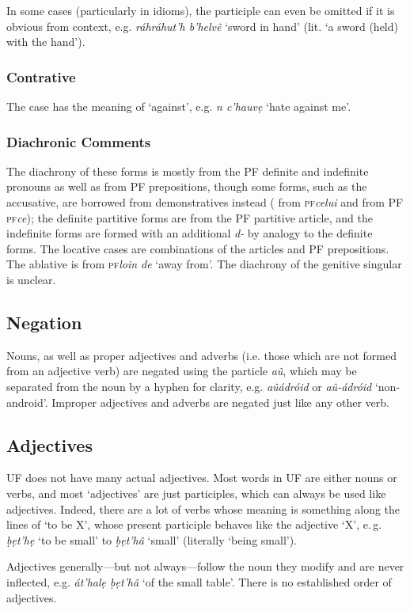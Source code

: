 \documentclass[a4paper, 12pt, twoside, final]{article}
\def\pfabbr{{\normalfont\scshape pf\space}}
\def\pf#1{\pfabbr\textit{#1}}
\let \w \textit
\begin{document}
In some cases (particularly in idioms), the participle can even be omitted if it is obvious from context, e.g. \w{ráhráhut’h
b’helvê} ‘sword in hand’ (lit. ‘a sword (held) with the hand’).

\subsubsection{Contrative}
The  case has the meaning of ‘against’, e.g. \w{n c’hauvẹ} ‘hate against me’.

\subsubsection{Diachronic Comments}
The diachrony of these forms is mostly from the PF definite and indefinite pronouns as well as from PF prepositions, though
some forms, such as the
accusative, are borrowed from demonstratives instead ( from \pf{celui} and  from PF \pf{ce}); the definite
partitive forms are from the PF partitive article, and
the indefinite forms are formed with an additional \w{d-} by analogy to the definite forms. The locative cases are combinations
of the articles and PF prepositions. The ablative is from \pf{loin de} ‘away from’. The diachrony of the genitive singular
is unclear.

\subsection{Negation}\label{subsubsec:noun-negation}
Nouns, as well as proper adjectives and adverbs (i.e. those which are not formed from an adjective verb) are negated
using the particle \w{aû}, which may be separated from the noun by a hyphen for clarity, e.g. \w{aûádróid} or \w{aû-ádróid}
‘non-android’. Improper adjectives and adverbs are negated just like any other verb.

\subsection{Adjectives}
UF does not have many actual adjectives. Most words in UF are either nouns or verbs, and most ‘adjectives’ are just
participles, which can always be used like adjectives. Indeed, there are a lot of verbs whose meaning is something
along the lines of ‘to be X’, whose present participle behaves like the adjective ‘X’, e.\,g. \w{ḅẹt’hẹ} ‘to be small’
to \w{ḅẹt’hâ} ‘small’ (literally ‘being small’).

Adjectives generally—but not always—follow the noun they modify and are never inflected, e.g. \w{át’halẹ ḅẹt’hâ} ‘of the small table’.
There is no established order of adjectives.
\end{document}
